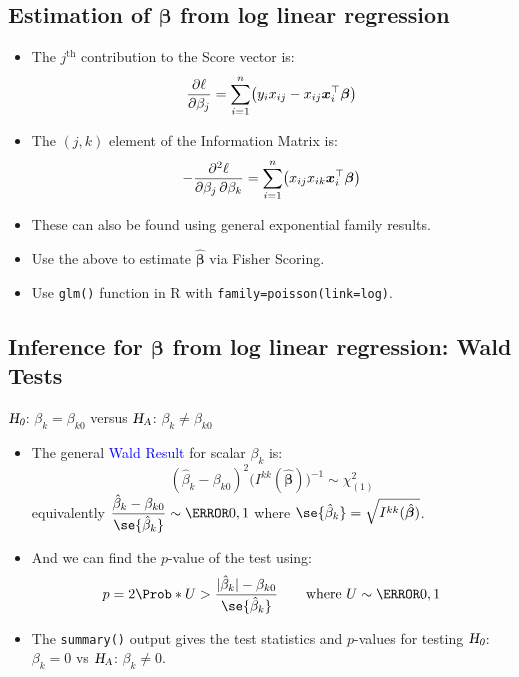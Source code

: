 \documentclass[oneside]{book}\usepackage[]{graphicx}\usepackage[svgnames]{xcolor}
\let\exp\relax%
\newcommand{\HN}{\textsl{H}_{\textsl{0}}}%
\newcommand{\HA}{\textsl{H}_{\textsl{A}}}%
\DeclarePairedDelimiter\abs{\lvert}{\rvert}
\providecommand{\Vector}[1]{\bm{#1}}%
\begin{document}
\subsection*{Estimation of $ \Vector{\beta} $ from log linear regression}
\begin{itemize}
      \item The $ j^{\text{th}} $ contribution to the Score vector is:
            \[ \pdv{\ell}{\beta_j}=\sum_{i=1}^{n}\bigl(y_i x_{ij}-x_{ij}\exp{\Vector{x}_i^\top \Vector{\beta}}\bigr) \]
      \item The $ (j,k) $ element of the Information Matrix is:
            \[ -\pdv{\ell}{\beta_j,\beta_k}=\sum_{i=1}^{n} \bigl(x_{ij}x_{ik}\exp{\Vector{x}_i^\top \Vector{\beta}}\bigr) \]
      \item These can also be found using general exponential family results.
      \item Use the above to estimate $ \hat{\Vector{\beta}} $ via Fisher Scoring.
      \item Use \texttt{glm()} function in R with \texttt{family=poisson(link=log)}.
\end{itemize}
\subsection*{Inference for $ \Vector{\beta} $ from log linear regression: Wald Tests}
\begin{center}
      $ \HN $: $ \beta_k=\beta_{k0} $ versus $ \HA $: $ \beta_k\ne \beta_{k0} $
\end{center}
\begin{itemize}
      \item The general \textcolor{Blue}{Wald Result} for scalar $ \beta_k $ is:
            \[ (\hat{\beta}_k-\beta_{k0})^2\bigl(I^{kk}(\hat{\Vector{\beta}})\bigr)^{-1} \sim \chi^2_{(1)} \]
            equivalently $ \dfrac{\hat{\beta}_k-\beta_{k0}}{\se{\hat{\beta}_k}}\sim \N{0,1} $ where $ \se{\hat{\beta}_k}=\sqrt{I^{kk}(\hat{\Vector{\beta}})} $.
      \item And we can find the $ p $-value of the test using:
            \[ p=2\Prob*{U>\frac{\abs{\hat{\beta}_k}-\beta_{k0}}{\se{\hat{\beta}_k}}}\qquad\text{where $U \sim \N{0,1}$} \]
      \item The \texttt{summary()} output gives the test statistics and $p$-values for testing $ \HN $: $ \beta_k=0 $ vs $ \HA $: $ \beta_k\ne 0 $.
\end{itemize}
\end{document}
